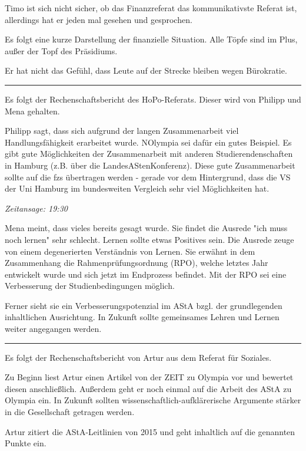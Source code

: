 \documentclass[ngerman,headheight=70pt]{scrartcl}
\begin{document}
    Timo ist sich nicht sicher, ob das Finanzreferat das kommunikativste Referat
    ist, allerdings hat er jeden mal gesehen und gesprochen.

    Es folgt eine kurze Darstellung der finanzielle Situation. Alle Töpfe sind im
    Plus, außer der Topf des Präsidiums.

    Er hat nicht das Gefühl, dass Leute auf der Strecke bleiben wegen Bürokratie.

    \hrule

    Es folgt der Rechenschaftsbericht des HoPo-Referats. Dieser wird von Philipp
    und Mena gehalten.

    Philipp sagt, dass sich aufgrund der langen Zusammenarbeit viel Handlungsfähigkeit
    erarbeitet wurde. NOlympia sei dafür ein gutes Beispiel. Es gibt gute
    Möglichkeiten der Zusammenarbeit mit anderen Studierendenschaften in Hamburg
    (z.B. über die LandesAStenKonferenz). Diese gute Zusammenarbeit sollte auf
    die fzs übertragen werden - gerade vor dem Hintergrund, dass die VS der Uni
    Hamburg im bundesweiten Vergleich sehr viel Möglichkeiten hat.

    \textit{Zeitansage: 19:30}

    Mena meint, dass vieles bereits gesagt wurde. Sie findet die Ausrede "ich
    muss noch lernen" sehr schlecht. Lernen sollte etwas Positives sein. Die Ausrede
    zeuge von einem degenerierten Verständnis von Lernen. Sie erwähnt in dem
    Zusammenhang die Rahmenprüfungsordnung (RPO), welche letztes Jahr entwickelt wurde
    und sich jetzt im Endprozess befindet. Mit der RPO sei eine Verbesserung der
    Studienbedingungen möglich.

    Ferner sieht sie ein Verbesserungspotenzial im AStA bzgl. der grundlegenden
    inhaltlichen Ausrichtung. In Zukunft sollte gemeinsames Lehren und Lernen
    weiter angegangen werden.

    \hrule

    Es folgt der Rechenschaftsbericht von Artur aus dem Referat für Soziales.

    Zu Beginn liest Artur einen Artikel von der ZEIT zu Olympia vor und bewertet
    diesen anschließlich. Außerdem geht er noch einmal auf die Arbeit des AStA
    zu Olympia ein. In Zukunft sollten wissenschaftlich-aufklärerische Argumente
    stärker in die Gesellschaft getragen werden.

    Artur zitiert die AStA-Leitlinien von 2015 und geht inhaltlich auf die
    genannten Punkte ein.
\end{document}
